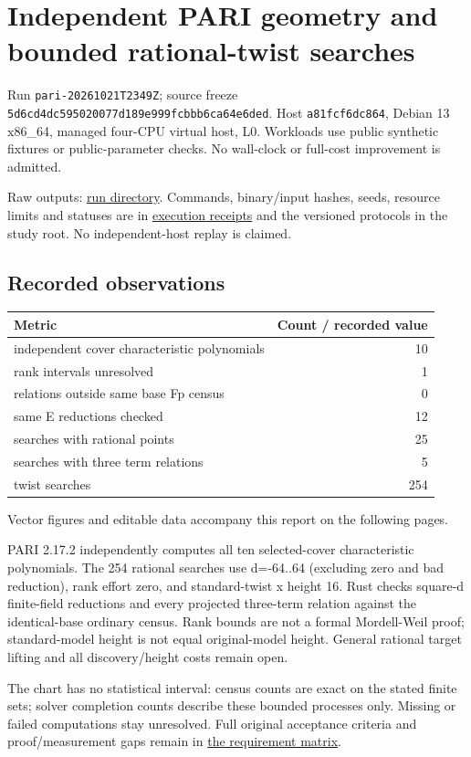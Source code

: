 \documentclass[
  10pt,
  letterpaper,
  landscape]{article}
\author{}
\date{}
\begin{document}
\section{Independent PARI geometry and bounded rational-twist
searches}\label{independent-pari-geometry-and-bounded-rational-twist-searches}

Run \texttt{pari-20261021T2349Z}; source freeze
\texttt{5d6cd4dc595020077d189e999fcbbb6ca64e6ded}. Host
\texttt{a81fcf6dc864}, Debian 13 x86\_64, managed four-CPU virtual host,
L0. Workloads use public synthetic fixtures or public-parameter checks.
No wall-clock or full-cost improvement is admitted.

Raw outputs: \href{../../../execution-v1/runs/pari-20261021T2349Z/}{run
directory}. Commands, binary/input hashes, seeds, resource limits and
statuses are in \href{../../../execution-v1/}{execution receipts} and
the versioned protocols in the study root. No independent-host replay is
claimed.

\subsection{Recorded observations}\label{recorded-observations}

\begin{longtable}[]{@{}lr@{}}
\toprule\noalign{}
Metric & Count / recorded value \\
\midrule\noalign{}
\endhead
\bottomrule\noalign{}
\endlastfoot
independent cover characteristic polynomials & 10 \\
rank intervals unresolved & 1 \\
relations outside same base Fp census & 0 \\
same E reductions checked & 12 \\
searches with rational points & 25 \\
searches with three term relations & 5 \\
twist searches & 254 \\
\end{longtable}

Vector figures and editable data accompany this report on the following pages.

PARI 2.17.2 independently computes all ten selected-cover characteristic
polynomials. The 254 rational searches use d=-64..64 (excluding zero and
bad reduction), rank effort zero, and standard-twist x height 16. Rust
checks square-d finite-field reductions and every projected three-term
relation against the identical-base ordinary census. Rank bounds are not
a formal Mordell-Weil proof; standard-model height is not equal
original-model height. General rational target lifting and all
discovery/height costs remain open.

The chart has no statistical interval: census counts are exact on the
stated finite sets; solver completion counts describe these bounded
processes only. Missing or failed computations stay unresolved. Full
original acceptance criteria and proof/measurement gaps remain in
\href{../../../EXPERIMENTS.md}{the requirement matrix}.
\end{document}
